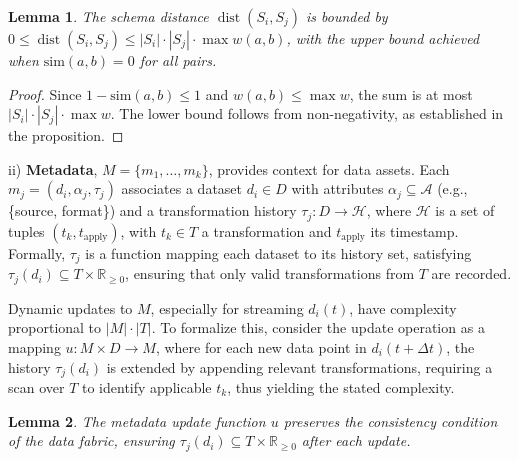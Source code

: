\documentclass{amsart}
\newtheorem{lem}{Lemma}
\newcommand\R{\mathbb R}
\DeclareMathOperator\dist{dist}
\begin{document}
\begin{lem} \label{lem:schema_distance_bounds}
The schema distance \( \dist(S_i, S_j) \) is bounded by \( 0 \leq \dist(S_i, S_j) \leq |S_i| \cdot |S_j| \cdot \max w(a, b) \), with the upper bound achieved when \( \text{sim}(a, b) = 0 \) for all pairs.
\end{lem}

\begin{proof}
Since \( 1 - \text{sim}(a, b) \leq 1 \) and \( w(a, b) \leq \max w \), the sum is at most \( |S_i| \cdot |S_j| \cdot \max w \). The lower bound follows from non-negativity, as established in the proposition.
\end{proof}

%
ii)  \textbf{Metadata}, \( M = \{m_1, \dots, m_k\} \), provides context for data assets. Each \( m_j = (d_i, \alpha_j, \tau_j) \) associates a dataset \( d_i \in D \) with attributes \( \alpha_j \subseteq \mathcal{A} \) (e.g., \{source, format\}) and a transformation history \( \tau_j: D \to \mathcal{H} \), where \( \mathcal{H} \) is a set of tuples \( (t_k, t_{\text{apply}}) \), with \( t_k \in T \) a transformation and \( t_{\text{apply}} \) its timestamp. Formally, \( \tau_j \) is a function mapping each dataset to its history set, satisfying \( \tau_j(d_i) \subseteq T \times \R_{\geq 0} \), ensuring that only valid transformations from \( T \) are recorded.

Dynamic updates to \( M \), especially for streaming \( d_i(t) \), have complexity proportional to \( |M| \cdot |T| \). To formalize this, consider the update operation as a mapping \( u: M \times D \to M \), where for each new data point in \( d_i(t + \Delta t) \), the history \( \tau_j(d_i) \) is extended by appending relevant transformations, requiring a scan over \( T \) to identify applicable \( t_k \), thus yielding the stated complexity.

\begin{lem}\label{subsec:metadata}
The metadata update function \( u \) preserves the consistency condition of the data fabric, ensuring \( \tau_j(d_i) \subseteq T \times \R_{\geq 0} \) after each update.
\end{lem}
\end{document}
